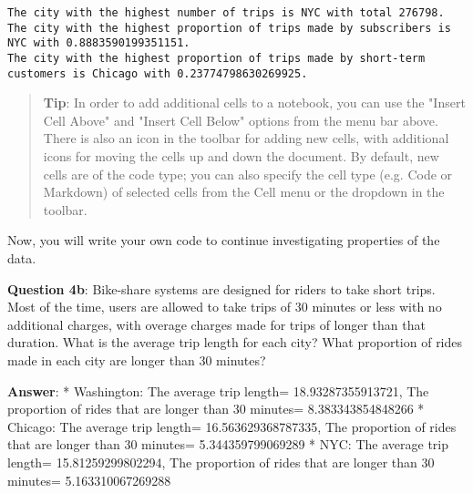 \documentclass[11pt]{article}
\begin{document}
    \begin{Verbatim}[commandchars=\\\{\}]
The city with the highest number of trips is NYC with total 276798.
The city with the highest proportion of trips made by subscribers is NYC with 0.8883590199351151.
The city with the highest proportion of trips made by short-term customers is Chicago with 0.23774798630269925.

    \end{Verbatim}

    \begin{quote}
\textbf{Tip}: In order to add additional cells to a notebook, you can
use the "Insert Cell Above" and "Insert Cell Below" options from the
menu bar above. There is also an icon in the toolbar for adding new
cells, with additional icons for moving the cells up and down the
document. By default, new cells are of the code type; you can also
specify the cell type (e.g. Code or Markdown) of selected cells from the
Cell menu or the dropdown in the toolbar.
\end{quote}

Now, you will write your own code to continue investigating properties
of the data.

\textbf{Question 4b}: Bike-share systems are designed for riders to take
short trips. Most of the time, users are allowed to take trips of 30
minutes or less with no additional charges, with overage charges made
for trips of longer than that duration. What is the average trip length
for each city? What proportion of rides made in each city are longer
than 30 minutes?

\textbf{Answer}: * Washington: The average trip length=
18.93287355913721, The proportion of rides that are longer than 30
minutes= 8.383343854848266 * Chicago: The average trip length=
16.563629368787335, The proportion of rides that are longer than 30
minutes= 5.344359799069289 * NYC: The average trip length=
15.81259299802294, The proportion of rides that are longer than 30
minutes= 5.163310067269288
\end{document}
